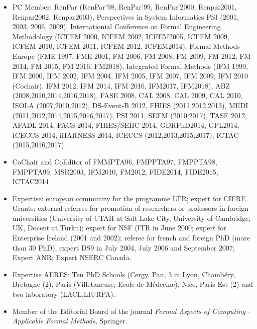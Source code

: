 \documentclass[ 12pt]{article}
\begin{document}


\begin{itemize}
\item PC Member:  RenPar (RenPar'98,
  RenPar'99, RenPar'2000,   Renpar2001,     Renpar2002,   Renpar2003),
  Perspectives  in System  Informatics  PSI (2001,  2003, 2006, 2009),
  Internationial Conference  on  Formal Engineering Methodology (ICFEM
  2000,  ICFEM  2002, ICFEM2005,  ICFEM  2009, ICFEM 2010, ICFEM 2011,
  ICFEM 2012,  ICFEM2014), Formal Methods Europe  (FME 1997, FME 2001,
  FM 2006, FM 2008,  FM  2009, FM 2012, FM   2014, FM 2015,  FM 2016, FM2018),
  Integrated Formal Methods (IFM 1999, IFM 2000, IFM 2002, IFM 2004, IFM
  2005,  IFM 2007, IFM  2009, IFM 2010 (Cochair),  IFM 2012, IFM 2014,
  IFM 2016, IFM2017, IFM2018),  ABZ (2008,2010,2014,2016,2018), FASE 2008, CAL 2008,
  CAL 2009, CAL  2010, ISOLA (2007,2010,2012),  DS-Event-B 2012, FHIES
  (2011,2012,2013),  MEDI   (2011,2012,2014,2015,2016,2017), PSI 2011,
  SEFM (2010;2017), TASE 2012, AFADL 2014, FACS 2014, FHIES/SEHC 2014,
  GDRPhD2014,   GPL2014,   ICECCS   2014,    iHARNESS   2014,   ICECCS
  (2012,2013,2015,2017), ICTAC (2015,2016,2017).

\item CoChair and CoEditor of FMMPTA96, FMPPTA97, FMPPTA98, FMPPTA99, MSR2003, 
IFM2010, FM2012, FIDE2014, FIDE2015, ICTAC2014
\item Expertise: european community for  the programme LTR; expert for
  CIFRE   Grants; external referres  for  promotion  of researchers or
  professors in foreign universities  (University of UTAH at Salt Lake
  City, University of Cambridge, UK, Docent at  Turku); expert for NSF
  (ITR in June  2000; expert for Enterprise  Ireland (2001 and  2002);
  referee for french and foreign PhD (more than 30 PhD), expert DS9 in
  July  2004, July 2006 and  September  2007; Expert ANR; Expert NSERC
  Canada.


\item Expertise  AERES: Ten PhD Schools (Cergy, Pau,  3 in  Lyon, Chamb\'ery, Bretagne (2), Paris (Villetaneuse,   Ecole de M\'edecine), Nice, Paris Est (2) and two laboratory (LACL,LIURPA). 



\item Member of the Editorial Board of the journal \textit{Formal Aspects of Computing - 
Applicable Formal Methods}, Springer.

\end{itemize}
\end{document}
